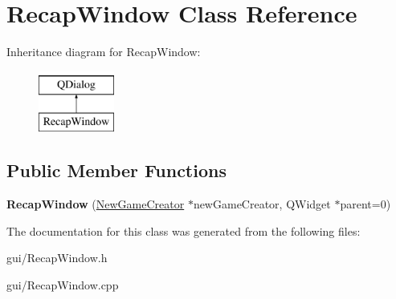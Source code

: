 \hypertarget{classRecapWindow}{}\section{Recap\+Window Class Reference}
\label{classRecapWindow}
Inheritance diagram for Recap\+Window\+:\begin{figure}[H]
\begin{center}
\leavevmode
\includegraphics[height=2.000000cm]{classRecapWindow}
\end{center}
\end{figure}
\subsection*{Public Member Functions}
\begin{DoxyCompactItemize}
\item 
\mbox{\label{classRecapWindow_a0f89f24533eeeb2c5d91376dc14c5602}} 
{\bfseries Recap\+Window} (\hyperlink{classNewGameCreator}{New\+Game\+Creator} $\ast$new\+Game\+Creator, Q\+Widget $\ast$parent=0)
\end{DoxyCompactItemize}


The documentation for this class was generated from the following files\+:\begin{DoxyCompactItemize}
\item 
gui/Recap\+Window.\+h\item 
gui/Recap\+Window.\+cpp\end{DoxyCompactItemize}
